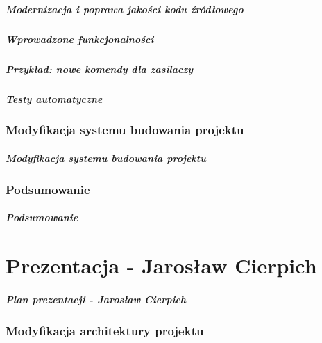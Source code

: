 \documentclass[10pt]{beamer}
\begin{document}
\begin{frame}
\frametitle{Modernizacja i poprawa jakości kodu źródłowego}
\end{frame}

\begin{frame}
\frametitle{Wprowadzone funkcjonalności}
\end{frame}

\begin{frame}
\frametitle{Przykład: nowe komendy dla zasilaczy}
\end{frame}

\begin{frame}
\frametitle{Testy automatyczne}
\end{frame}


\section{Modyfikacja systemu budowania projektu}

\begin{frame}
\frametitle{Modyfikacja systemu budowania projektu}
\end{frame}

\section{Podsumowanie}

\begin{frame}
\frametitle{Podsumowanie}
\end{frame}


\part{Prezentacja - Jarosław Cierpich}

\begin{frame}
\frametitle{Plan prezentacji - Jarosław Cierpich}
\tableofcontents
\end{frame}

\section{Modyfikacja architektury projektu}
\end{document}
